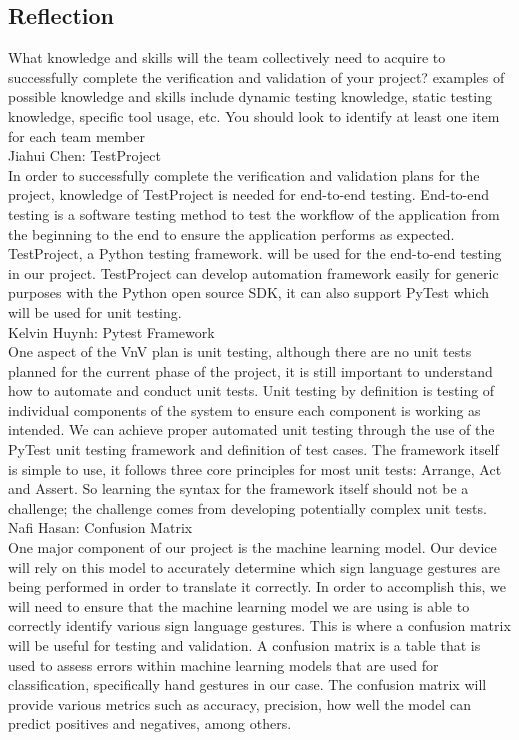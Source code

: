 \documentclass[12pt]{article}
\begin{document}
\subsection{Reflection}
\begin{outline}[enumerate]
  \1 What knowledge and skills will the team collectively need to acquire to successfully complete the verification and validation of your project?
  examples of possible knowledge and skills include dynamic testing knowledge, static testing knowledge, specific tool usage, etc. You should look to
  identify at least one item for each team member\\
    \2 Jiahui Chen: TestProject\\
    In order to successfully complete the verification and validation plans for the project, knowledge of TestProject is needed for end-to-end testing. End-to-end testing 
    is a software testing method to test the workflow of the application from the beginning to the end to ensure the application performs as expected. TestProject, a Python 
    testing framework. will be used for the end-to-end testing in our project. TestProject can develop automation framework easily for generic purposes with the Python open 
    source SDK, it can also support PyTest which will be used for unit testing.\\
    \2 Kelvin Huynh: Pytest Framework\\
    One aspect of the VnV plan is unit testing, although there are no unit tests planned for the current phase of the project, it is still important to understand how to 
    automate and conduct unit tests. Unit testing by definition is testing of individual components of the system to ensure each component is working as intended. We can 
    achieve proper automated unit testing through the use of the PyTest unit testing framework and definition of test cases. The framework itself is simple to use, it follows 
    three core principles for most unit tests: Arrange, Act and Assert. So learning the syntax for the framework itself should not be a challenge; the challenge comes from 
    developing potentially complex unit tests.\\
    \2 Nafi Hasan: Confusion Matrix\\
One major component of our project is the machine learning model. Our device will rely on this model to accurately determine which sign language gestures are
being performed in order to translate it correctly. In order to accomplish this, we will need to ensure that the machine learning model we are using is able to 
correctly identify various sign language gestures. This is where a confusion matrix will be useful for testing and validation. A confusion matrix is a table that is 
used to assess errors within machine learning models that are used for classification, specifically hand gestures in our case. The confusion matrix will provide
various metrics such as accuracy, precision, how well the model can predict positives and negatives, among others.\\


\end{outline}
\end{document}
